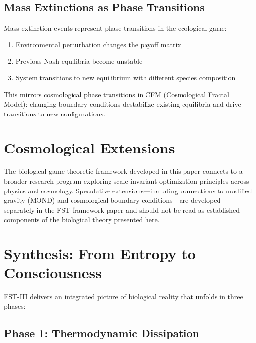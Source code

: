 \documentclass[12pt,a4paper]{article}
\theoremstyle{remark}
\begin{document}
\subsection{Mass Extinctions as Phase Transitions}

Mass extinction events represent phase transitions in the ecological game:
\begin{enumerate}
    \item Environmental perturbation changes the payoff matrix
    \item Previous Nash equilibria become unstable
    \item System transitions to new equilibrium with different species composition
\end{enumerate}

This mirrors cosmological phase transitions in CFM (Cosmological Fractal Model): changing boundary conditions destabilize existing equilibria and drive transitions to new configurations.

\section{Cosmological Extensions}
\label{sec:cosmology}

The biological game-theoretic framework developed in this paper connects to a broader research program exploring scale-invariant optimization principles across physics and cosmology. Speculative extensions---including connections to modified gravity (MOND) and cosmological boundary conditions---are developed separately in the FST framework paper \citep{FST-Unified2026} and should not be read as established components of the biological theory presented here.

\section{Synthesis: From Entropy to Consciousness}
\label{sec:synthesis}

FST-III delivers an integrated picture of biological reality that unfolds in three phases:

\subsection{Phase 1: Thermodynamic Dissipation}
\end{document}
